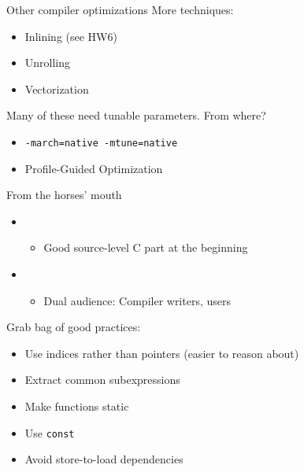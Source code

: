 \documentclass[english,compress]{beamer}
\begin{document}
\begin{frame}{Other compiler optimizations}
  More techniques:
  \begin{itemize}
    \item Inlining (see HW6)
    \item Unrolling
    \item Vectorization
  \end{itemize}

  \bigskip
  Many of these need tunable parameters. From where?
  \begin{itemize}
    \item \texttt{-march=native -mtune=native}
    \item Profile-Guided Optimization
  \end{itemize}
\end{frame}
\begin{frame}{From the horses' mouth}
  \begin{itemize}
    \item
      \begin{itemize}
        \item Good source-level C part at the beginning
      \end{itemize}
    \item {}
      \begin{itemize}
        \item Dual audience: Compiler writers, users
      \end{itemize}
  \end{itemize}

  \bigskip
  Grab bag of good practices:
  \begin{itemize}
    \item Use indices rather than pointers (easier to reason about)
    \item Extract common subexpressions
    \item Make functions static
    \item Use \texttt{const}
    \item Avoid store-to-load dependencies
  \end{itemize}
\end{frame}
\end{document}

